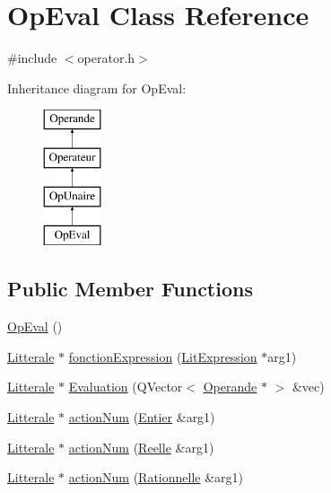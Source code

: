 \hypertarget{class_op_eval}{}\section{Op\+Eval Class Reference}
\label{class_op_eval}


{\ttfamily \#include $<$operator.\+h$>$}

Inheritance diagram for Op\+Eval\+:\begin{figure}[H]
\begin{center}
\leavevmode
\includegraphics[height=4.000000cm]{class_op_eval}
\end{center}
\end{figure}
\subsection*{Public Member Functions}
\begin{DoxyCompactItemize}
\item 
\hyperlink{class_op_eval_a936d2baca811dbe01a8a4fb3e40176cc}{Op\+Eval} ()
\item 
\hyperlink{class_litterale}{Litterale} $\ast$ \hyperlink{class_op_eval_a1b949d04bab4f73df520319fa70befc9}{fonction\+Expression} (\hyperlink{class_lit_expression}{Lit\+Expression} $\ast$arg1)
\item 
\hyperlink{class_litterale}{Litterale} $\ast$ \hyperlink{class_op_eval_a08658b2923120466790285bc4100783b}{Evaluation} (Q\+Vector$<$ \hyperlink{class_operande}{Operande} $\ast$ $>$ \&vec)
\item 
\hyperlink{class_litterale}{Litterale} $\ast$ \hyperlink{class_op_eval_a4b18ba29a4c6dbc0ce5209649be31135}{action\+Num} (\hyperlink{class_entier}{Entier} \&arg1)
\item 
\hyperlink{class_litterale}{Litterale} $\ast$ \hyperlink{class_op_eval_a56b918642321c739817131a3623a9a9b}{action\+Num} (\hyperlink{class_reelle}{Reelle} \&arg1)
\item 
\hyperlink{class_litterale}{Litterale} $\ast$ \hyperlink{class_op_eval_a793878476d51abf60bed8e78206394b1}{action\+Num} (\hyperlink{class_rationnelle}{Rationnelle} \&arg1)
\end{DoxyCompactItemize}
